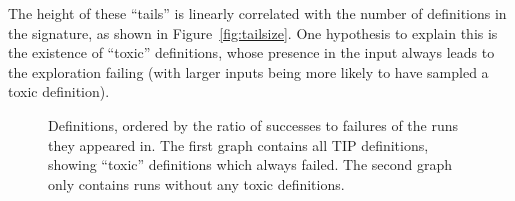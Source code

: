 \iffalse
\begin{figure}
  \scalebox{0.45}{}
  \scalebox{0.45}{}
  \caption{Proportion of samples which timed out per size, with least-squares
    linear regression. First plot is for all TIP definitions, second removes
    runs given ``toxic'' definitions.}
  \label{fig:tailsize}
\end{figure}
\fi

The height of these ``tails'' is linearly correlated with the number of
definitions in the signature, as shown in Figure~\ref{fig:tailsize}. One
hypothesis to explain this is the existence of ``toxic'' definitions, whose
presence in the input always leads to the exploration failing (with larger
inputs being more likely to have sampled a toxic definition).

\begin{figure}
  \scalebox{0.45}{}
  \scalebox{0.45}{}
  \caption{Definitions, ordered by the ratio of successes to failures of the
    runs they appeared in. The first graph contains all TIP definitions, showing
    ``toxic'' definitions which always failed. The second graph only contains
    runs without any toxic definitions.
    \iffalse
    TODO: Alison: ? (ME: The green/red bar graphs appear as empty white boxes in
    the PDF Alison sent over. Check how it's rendered!)
    TODO: The x-axis ticks are crap (all overlapping); turn them off, put a
    single label like ``Definitions (ordered by failure rate)''
    \fi}
  \label{fig:proportions}
\end{figure}

